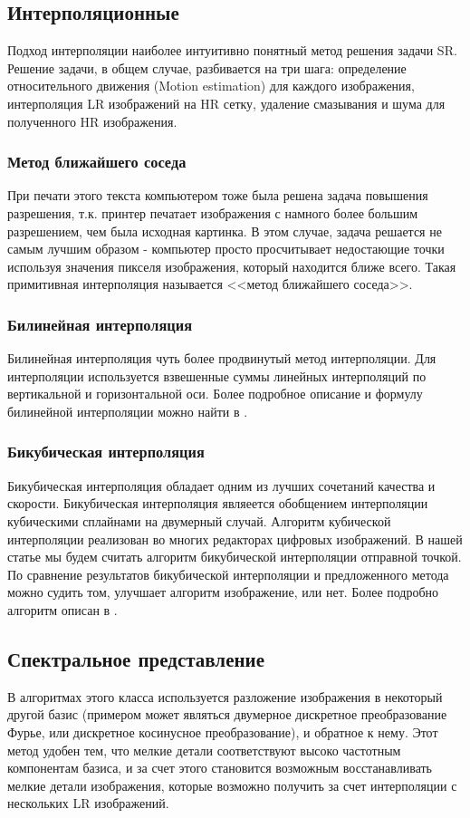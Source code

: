 \subsection{Интерполяционные} Подход интерполяции наиболее интуитивно понятный метод решения задачи SR. Решение задачи,
в общем случае, разбивается на три шага: определение относительного движения (Motion estimation) для каждого
изображения, интерполяция LR изображений на HR сетку, удаление смазывания и шума для полученного HR изображения.

\subsubsection{Метод ближайшего соседа}
При печати этого текста компьютером тоже была решена задача повышения разрешения, т.к. принтер печатает изображения с
намного более большим разрешением, чем была исходная картинка. В этом случае, задача решается не самым лучшим образом -
компьютер просто просчитывает недостающие точки используя значения пикселя изображения, который находится ближе всего.
Такая примитивная интерполяция называется <<метод ближайшего соседа>>.

\subsubsection{Билинейная интерполяция}
Билинейная интерполяция чуть более продвинутый метод интерполяции. Для интерполяции используется взвешенные суммы
линейных интерполяций по вертикальной и горизонтальной оси. Более подробное описание и формулу билинейной интерполяции
можно найти в \cite[стр. 64]{gonzalez2002woods}.

\subsubsection{Бикубическая интерполяция}
Бикубическая интерполяция обладает одним из лучших сочетаний качества и скорости.  Бикубическая
интерполяция являеется обобщением интерполяции кубическими сплайнами на двумерный случай. Алгоритм кубической
интерполяции реализован во многих редакторах цифровых изображений. В нашей статье мы будем считать алгоритм бикубической
интерполяции отправной точкой. По сравнение результатов бикубической интерполяции и предложенного метода можно судить
том, улучшает алгоритм изображение, или нет. Более подробно алгоритм описан в  \cite{keys1981cubic}.

\subsection{Спектральное представление}
В алгоритмах этого класса используется разложение изображения в некоторый другой
базис (примером может являться двумерное дискретное преобразование Фурье, или дискретное косинусное преобразование), и
обратное к нему.  Этот метод удобен тем, что мелкие детали соответствуют высоко частотным компонентам базиса, и за счет
этого становится возможным восстанавливать мелкие детали изображения, которые возможно получить за счет интерполяции с
нескольких LR изображений.

